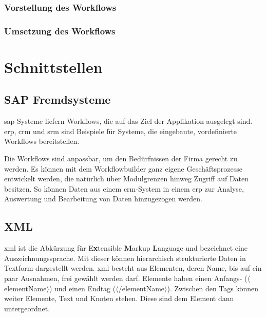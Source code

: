 \subsubsection{Vorstellung des Workflows}
\label{sec:builder-2-bsp-vorstellung}

\subsubsection{Umsetzung des Workflows}
\label{sec:builder-2-bsp-umsetzung}

\section{Schnittstellen}

\subsection{SAP Fremdsysteme}
\label{sec:export-sap}

\gls{sap} Systeme liefern Workflows, die auf das Ziel der Applikation ausgelegt sind. \gls{erp}, \gls{crm} und \gls{srm} sind Beispiele für Systeme, die eingebaute, vordefinierte Workflows bereitstellen. 

Die Workflows sind anpassbar, um den Bedürfnissen der Firma gerecht zu werden. Es können mit dem Workflowbuilder ganz eigene Geschäftsprozesse entwickelt werden, die natürlich über Modulgrenzen hinweg Zugriff auf Daten besitzen. So können Daten aus einem \gls{crm}-System in einem \gls{erp} zur Analyse, Auswertung und Bearbeitung von Daten hinzugezogen werden.

\subsection{XML}
\label{sec:export-xml}

\gls{xml} ist die Abkürzung für E\textbf{x}tensible \textbf{M}arkup \textbf{L}anguage und bezeichnet eine Auszeichnungssprache. Mit dieser können hierarchisch strukturierte Daten in Textform dargestellt werden. \gls{xml} besteht aus Elementen, deren Name, bis auf ein paar Ausnahmen, frei gewählt werden darf. Elemente haben einen Anfangs- ($\langle$elementName$\rangle$) und einen Endtag ($\langle$/elementName$\rangle$). Zwischen den Tags können weiter Elemente, Text und Knoten stehen. Diese sind dem Element dann untergeordnet.

